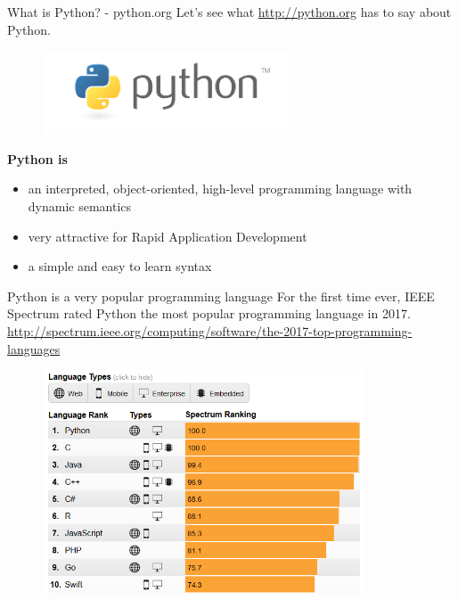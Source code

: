 \documentclass[10pt]{beamer}
\begin{document}
\begin{frame}{What is Python? - python.org}
Let's see what \url{http://python.org} has to say about Python.
      	
      	\begin{figure} 	
 	\includegraphics[width=0.65\textwidth]{figs/pythonLogo.png}
      \end{figure}

\textbf{Python is}
\begin{itemize}
\item an interpreted, object-oriented, high-level programming language with dynamic semantics
\item very attractive for Rapid Application Development
\item a simple and easy to learn syntax
\end{itemize}
\end{frame}

\begin{frame}{Python is a very popular programming language}
For the first time ever, IEEE Spectrum rated Python the most popular programming language in 2017. \url{http://spectrum.ieee.org/computing/software/the-2017-top-programming-languages}
\begin{figure}
 	\includegraphics[width=0.85\textwidth]{figs/ieee.png}
\end{figure}
\end{frame}
\end{document}
